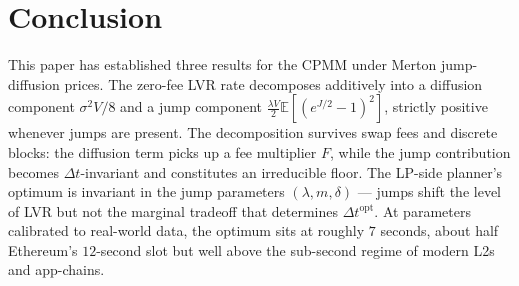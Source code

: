 \documentclass[runningheads]{llncs}
\newcommand{\E}{\mathbb{E}}
\newcommand{\dt}{\Delta t}
\newcommand{\1}{\mathbf{1}}
\begin{document}
\section{Conclusion}\label{sec:conclusion}

This paper has established three results for the CPMM under Merton jump-diffusion prices. The zero-fee LVR rate decomposes additively into a diffusion component $\sigma^2 V/8$ and a jump component $\tfrac{\lambda V}{2}\E[(e^{J/2}-1)^2]$, strictly positive whenever jumps are present. The decomposition survives swap fees and discrete blocks: the diffusion term picks up a fee multiplier $F$, while the jump contribution becomes $\dt$-invariant and constitutes an irreducible floor. The LP-side planner's optimum is invariant in the jump parameters $(\lambda, m, \delta)$ --- jumps shift the level of LVR but not the marginal tradeoff that determines $\dt^{\mathrm{opt}}$. At parameters calibrated to real-world data, the optimum sits at roughly $7$ seconds, about half Ethereum's $12$-second slot but well above the sub-second regime of modern L2s and app-chains.



\end{document}
